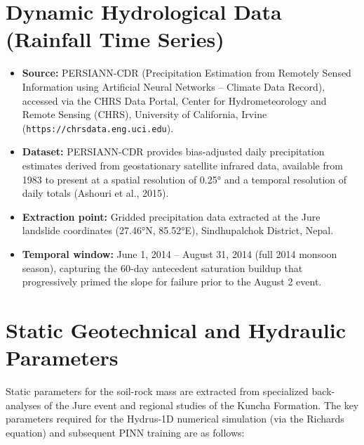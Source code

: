 \documentclass[12pt]{report}
\begin{document}
\section{Dynamic Hydrological Data (Rainfall Time Series)}

\begin{itemize}

    \item \textbf{Source:} PERSIANN-CDR (Precipitation Estimation from
    Remotely Sensed Information using Artificial Neural
    Networks -- Climate Data Record), accessed via the CHRS Data Portal,
    Center for Hydrometeorology and Remote Sensing (CHRS), University
    of California, Irvine
    (\texttt{https://chrsdata.eng.uci.edu}).

    \item \textbf{Dataset:} PERSIANN-CDR provides bias-adjusted daily
    precipitation estimates derived from geostationary satellite
    infrared data, available from 1983 to present at a spatial
    resolution of 0.25° and a temporal resolution of daily totals
    (Ashouri et al., 2015).

    \item \textbf{Extraction point:} Gridded precipitation data
    extracted at the Jure landslide coordinates (27.46°N, 85.52°E),
    Sindhupalchok District, Nepal.

    \item \textbf{Temporal window:} June 1, 2014 -- August 31, 2014
    (full 2014 monsoon season), capturing the 60-day antecedent
    saturation buildup that progressively primed the slope for failure
    prior to the August 2 event.


\end{itemize}
\section{Static Geotechnical and Hydraulic Parameters}

Static parameters for the soil-rock mass are extracted from specialized back-analyses of the Jure event and regional studies of the Kuncha Formation. The key parameters required for the Hydrus-1D numerical simulation (via the Richards equation) and subsequent PINN training are as follows:
\end{document}
